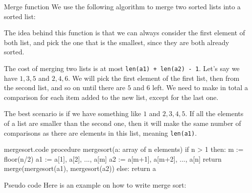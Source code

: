 \documentclass[a4paper]{article}
\begin{document}
\begin{parag}{Merge function}
    We use the following algorithm to merge two sorted lists into a sorted list:

    The idea behind this function is that we can always consider the first element of both list, and pick the one that is the smallest, since they are both already sorted. 

    The cost of merging two lists is at most \texttt{len(a1) + len(a2) - 1}. Let's say we have $1, 3, 5$ and $2, 4, 6$. We will pick the first element of the first list, then from the second list, and so on until there are $5$ and $6$ left. We need to make in total a comparison for each item added to the new list, except for the last one.

        The best scenario is if we have something like $1$ and $2, 3, 4, 5$. If all the elements of a list are smaller than the second one, then it will make the same number of comparisons as there are elements in this list, meaning \texttt{len(a1)}.
\end{parag}

\begin{filecontents*}[overwrite]{mergesort.code}
procedure mergesort(a: array of n elements)
    if n > 1 then:
        m := floor(n/2)
        a1 := a[1], a[2], ..., a[m]
        a2 := a[m+1], a[m+2], ..., a[n]
        return merge(mergesort(a1), mergesort(a2))
    else:
        return a
\end{filecontents*}

\begin{parag}{Pseudo code}
    Here is an example on how to write merge sort:
\end{parag}
\end{document}
